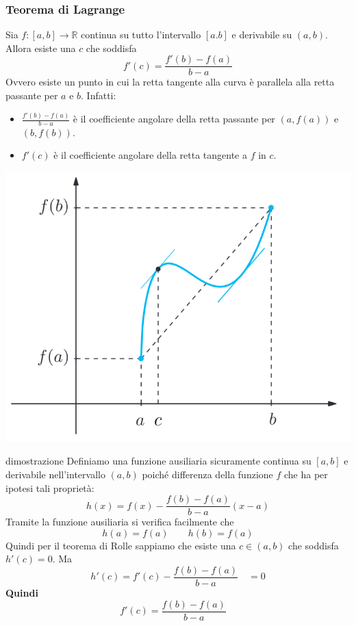 \documentclass[x11names]{article}
\begin{document}
	\begin{center}
		\colorbox{myred}{\begin{minipage}{5.75in}
				\begin{redes}{}
					\subsubsection{Teorema di Lagrange}
					Sia $f: [a,b] \to \mathbb{R}$ continua su tutto l'intervallo $[a.b]$ e derivabile su $(a,b)$. Allora esiste una $c$ che soddisfa
					\[
					f'(c) = \frac{f'(b) - f(a)}{b - a}
					\]
					Ovvero esiste un punto in cui la retta tangente alla curva è parallela alla retta passante per $a$ e $b$. Infatti:
					\begin{itemize}
						\item $\frac{f'(b) - f(a)}{b - a}$ è il coefficiente angolare della retta passante per $(a,f(a))$ e $(b,f(b))$.
						\item $f'(c)$ è il coefficiente angolare della retta tangente  a $f$ in $c$.
					\end{itemize}
				\end{redes}
		\end{minipage}}        
	\end{center}
	\begin{center}
		\includegraphics[scale=0.45]{figures/lagrange}
	\end{center}
	\begin{es}{dimostrazione}
		Definiamo una funzione ausiliaria sicuramente continua su $[a,b]$ e derivabile nell'intervallo $(a,b)$ poiché differenza della funzione $f$ che ha per ipotesi tali proprietà:
		\[
		h(x) = f(x) - \frac{f(b) - f(a)}{b - a}(x-a)
		\]
		Tramite la funzione ausiliaria si verifica facilmente che 
		\[
		h(a) = f(a) \qquad h(b) = f(a)
		\]
		Quindi per il teorema di Rolle sappiamo che esiste una $c \in (a,b)$ che soddisfa $h'(c) = 0$. Ma 
		\[
		h'(c) = f'(c) - \frac{f(b) - f(a)}{b - a} \quad = 0
		\]
		\textbf{Quindi}
		\[
		f'(c) = \frac{f(b) - f(a)}{b - a} \quad 
		\]
	\end{es}
\end{document}
